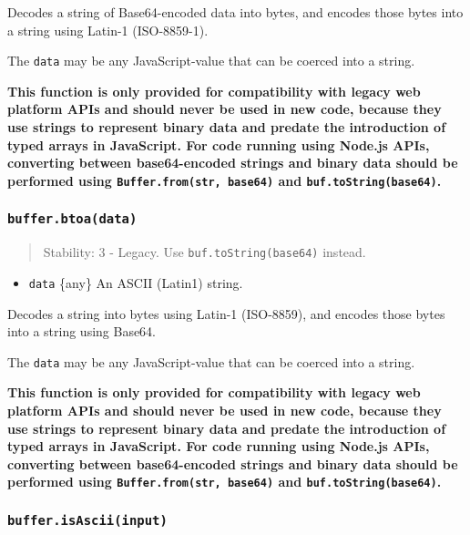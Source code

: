 Decodes a string of Base64-encoded data into bytes, and encodes those
bytes into a string using Latin-1 (ISO-8859-1).

The \texttt{data} may be any JavaScript-value that can be coerced into a
string.

\textbf{This function is only provided for compatibility with legacy web
platform APIs and should never be used in new code, because they use
strings to represent binary data and predate the introduction of typed
arrays in JavaScript. For code running using Node.js APIs, converting
between base64-encoded strings and binary data should be performed using
\texttt{Buffer.from(str,\ \textquotesingle{}base64\textquotesingle{})}
and \texttt{buf.toString(\textquotesingle{}base64\textquotesingle{})}.}

\subsubsection{\texorpdfstring{\texttt{buffer.btoa(data)}}{buffer.btoa(data)}}\label{buffer.btoadata}

\begin{quote}
Stability: 3 - Legacy. Use
\texttt{buf.toString(\textquotesingle{}base64\textquotesingle{})}
instead.
\end{quote}

\begin{itemize}
\tightlist
\item
  \texttt{data} \{any\} An ASCII (Latin1) string.
\end{itemize}

Decodes a string into bytes using Latin-1 (ISO-8859), and encodes those
bytes into a string using Base64.

The \texttt{data} may be any JavaScript-value that can be coerced into a
string.

\textbf{This function is only provided for compatibility with legacy web
platform APIs and should never be used in new code, because they use
strings to represent binary data and predate the introduction of typed
arrays in JavaScript. For code running using Node.js APIs, converting
between base64-encoded strings and binary data should be performed using
\texttt{Buffer.from(str,\ \textquotesingle{}base64\textquotesingle{})}
and \texttt{buf.toString(\textquotesingle{}base64\textquotesingle{})}.}

\subsubsection{\texorpdfstring{\texttt{buffer.isAscii(input)}}{buffer.isAscii(input)}}\label{buffer.isasciiinput}

